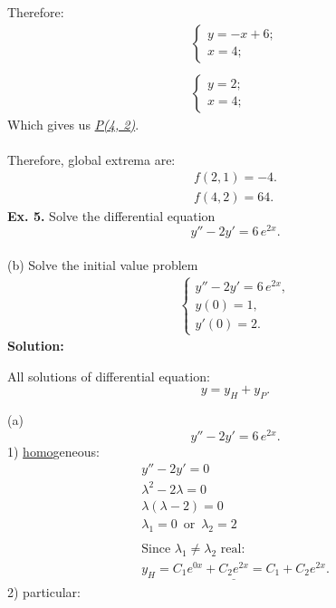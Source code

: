 \documentclass[a4paper, 12pt]{article}
\begin{document}
Therefore:
\begin{gather*}
\begin{cases}
y = -x+6;\\
x = 4;
\end{cases}\\\\
\begin{cases}
y = 2;\\
x = 4;
\end{cases}
\end{gather*}
Which gives us \underline{\emph{P(4, 2)}}.\\\\
Therefore, global extrema are:
\begin{gather*}
f(2, 1) = -4.\\
f(4, 2) = 64.
\end{gather*}
\newpage
\textbf{Ex. 5.} Solve the differential equation\\
\[ y'' -2y' = 6 \, e^{2x}. \]\\
(b) Solve the initial value problem\\
\begin{gather*}
\begin{cases}
y'' - 2y' = 6 \, e^{2x},\\
y(0) = 1,\\
y'(0) = 2.
\end{cases}
\end{gather*}
\bigbreak
\textbf{Solution:}\\
\begin{framed}
All solutions of differential equation:
\begin{equation*}
y = y_H + y_P.
\end{equation*}       
\end{framed}
(a) \\
\[ y'' -2y' = 6 \, e^{2x}. \]
1) \underline{homo}geneous:
\begin{gather*}
y'' - 2y' = 0\\
\lambda^2 - 2\lambda = 0\\
\lambda(\lambda - 2) = 0\\
\lambda_1 = 0 \,\,\, \text{or} \,\,\, \lambda_2 = 2\\\\
\text{Since } \lambda_1 \not = \lambda_2 \text{ real:}\\
\underline{y_H = C_1 e^{0x} + C_2 e^{2x} = C_1 + C_2 e^{2x}}.
\end{gather*}
2) particular:
\end{document}

